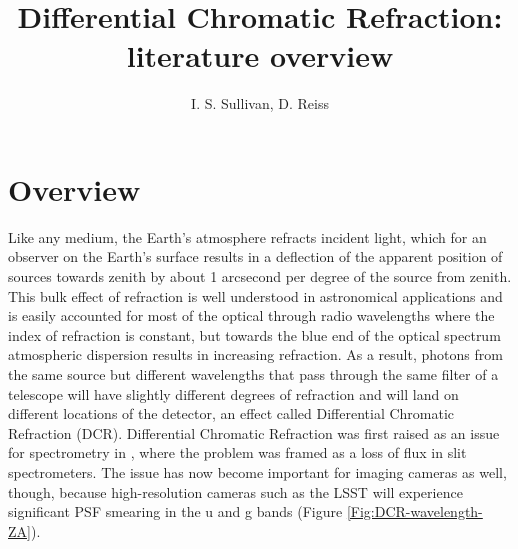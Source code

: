 \documentclass[]{article}
\title{Differential Chromatic Refraction: literature overview}
\author{I. S. Sullivan, D. Reiss}
\begin{document}
\maketitle


\begin{abstract}

\end{abstract}

\section{Overview}
Like any medium, the Earth's atmosphere refracts incident light, which for an observer on the Earth's surface results in a deflection of the apparent position of sources towards zenith by about 1 arcsecond per degree of the source from zenith. This bulk effect of refraction is well understood in astronomical applications and is easily accounted for most of the optical through radio wavelengths where the index of refraction is constant, but towards the blue end of the optical spectrum atmospheric dispersion results in increasing refraction. As a result, photons from the same source but different wavelengths that pass through the same filter of a telescope will have slightly different degrees of refraction and will land on different locations of the detector, an effect called Differential Chromatic Refraction (DCR). Differential Chromatic Refraction was first raised as an issue for spectrometry in \cite{Filippenko1982}, where the problem was framed as a loss of flux in slit spectrometers. The issue has now become important for imaging cameras as well, though, because high-resolution cameras such as the LSST will experience significant PSF smearing in the u and g bands (Figure  \ref{Fig:DCR-wavelength-ZA}).
\end{document}
